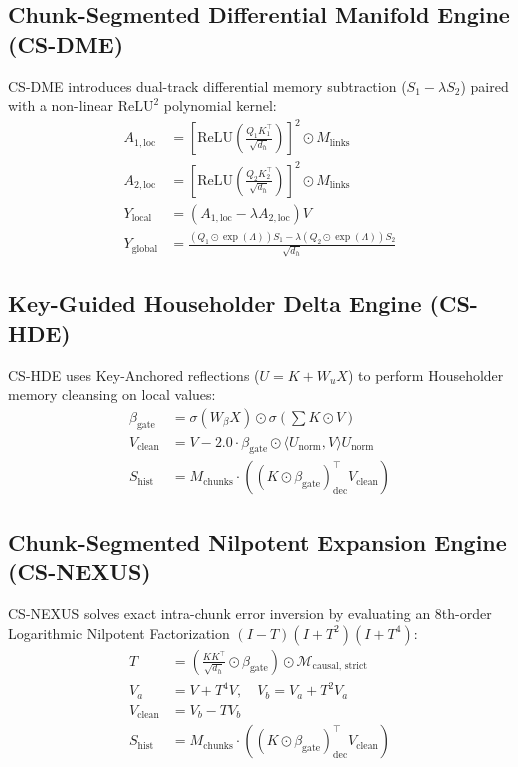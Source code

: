 \documentclass[twocolumn,10pt]{article}
\begin{document}
\subsection{Chunk-Segmented Differential Manifold Engine (CS-DME)}
CS-DME introduces dual-track differential memory subtraction ($S_1 - \lambda S_2$) paired with a non-linear $\text{ReLU}^2$ polynomial kernel:
\begin{align*}
A_{1,\text{loc}} &= \left[ \text{ReLU}\!\left( \frac{Q_1 K_1^\top}{\sqrt{d_h}} \right) \right]^2 \odot M_{\text{links}} \\
A_{2,\text{loc}} &= \left[ \text{ReLU}\!\left( \frac{Q_2 K_2^\top}{\sqrt{d_h}} \right) \right]^2 \odot M_{\text{links}} \\
Y_{\text{local}} &= (A_{1,\text{loc}} - \lambda A_{2,\text{loc}}) V \\
Y_{\text{global}} &= \frac{(Q_1 \odot \exp(\Lambda)) S_1 - \lambda (Q_2 \odot \exp(\Lambda)) S_2}{\sqrt{d_h}}
\end{align*}

\subsection{Key-Guided Householder Delta Engine (CS-HDE)}
CS-HDE uses Key-Anchored reflections ($U = K + W_u X$) to perform Householder memory cleansing on local values:
\begin{align*}
\beta_{\text{gate}} &= \sigma(W_{\beta} X) \odot \sigma\!\left( \sum K \odot V \right) \\
V_{\text{clean}} &= V - 2.0 \cdot \beta_{\text{gate}} \odot \langle U_{\text{norm}}, V \rangle U_{\text{norm}} \\
S_{\text{hist}} &= M_{\text{chunks}} \cdot \left( (K \odot \beta_{\text{gate}})_{\text{dec}}^\top V_{\text{clean}} \right)
\end{align*}

\subsection{Chunk-Segmented Nilpotent Expansion Engine (CS-NEXUS)}
CS-NEXUS solves exact intra-chunk error inversion by evaluating an 8th-order Logarithmic Nilpotent Factorization $(I-T)(I+T^2)(I+T^4)$:
\begin{align*}
T &= \left( \frac{K K^\top}{\sqrt{d_h}} \odot \beta_{\text{gate}} \right) \odot \mathcal{M}_{\text{causal, strict}} \\
V_a &= V + T^4 V, \quad V_b = V_a + T^2 V_a \\
V_{\text{clean}} &= V_b - T V_b \\
S_{\text{hist}} &= M_{\text{chunks}} \cdot \left( (K \odot \beta_{\text{gate}})_{\text{dec}}^\top V_{\text{clean}} \right)
\end{align*}
\end{document}
